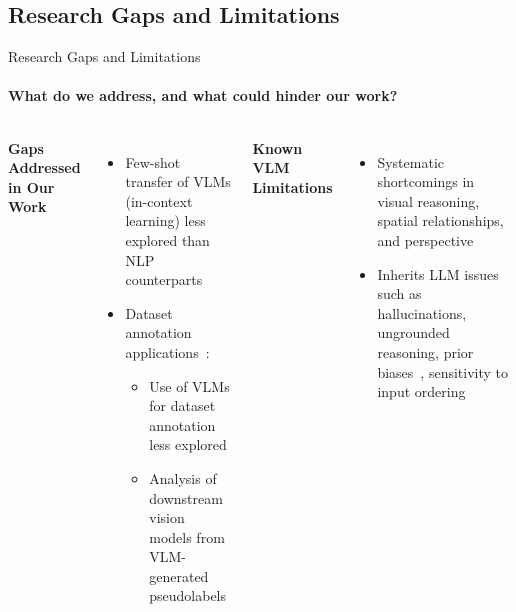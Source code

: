 \subsection{Research Gaps and Limitations}
\begin{frame}{Research Gaps and Limitations}
\framesubtitle{What do we address, and what could hinder our work?}
  \vspace{-1.2em}
  \begin{columns}[T]
    \column{\customcolumnwidth}
      \textbf{Gaps Addressed in Our Work}
      \vspace{-0.4em}
      \begin{itemize}
        \item Few-shot transfer of VLMs (in-context learning) less explored than NLP counterparts~
        \item Dataset annotation applications~:
        \begin{itemize}
          \item Use of VLMs for dataset annotation less explored
          \item Analysis of downstream vision models from VLM-generated pseudolabels
        \end{itemize}
      \end{itemize}
    \column{\customcolumnwidth}
      \textbf{Known VLM Limitations}
      \vspace{-0.4em}
      \begin{itemize}
        \item Systematic shortcomings in visual reasoning, spatial relationships, and perspective~
        \item Inherits LLM issues~ such as hallucinations, ungrounded reasoning, prior biases~, sensitivity to input ordering
      \end{itemize}
  \end{columns}
\end{frame}
